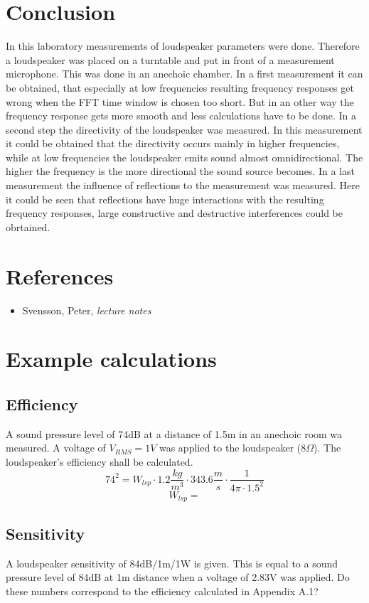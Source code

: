 \documentclass{article}
\begin{document}
\section{Conclusion}
In this laboratory measurements of loudspeaker parameters were done. Therefore a loudspeaker was placed on a turntable and put in front of a measurement microphone. This was done in an anechoic chamber. In a first measurement it can be obtained, that especially at low frequencies resulting frequency responses get wrong when the FFT time window is chosen too short. But in an other way the frequency response gets more smooth and less calculations have to be done. In a second step the directivity of the loudspeaker was measured. In this measurement it could be obtained that the directivity occurs mainly in higher frequencies, while at low frequencies the loudspeaker emits sound almost omnidirectional. The higher the frequency is the more directional the sound source becomes. In a last measurement the influence of reflections to the measurement was measured. Here it could be seen that reflections have huge interactions with the resulting frequency responses, large constructive and destructive interferences could be obrtained.

\newpage
\section*{References}
\footnotesize{
\begin{itemize}
\item Svensson, Peter, \textit{lecture notes}
\end{itemize}
}

\newpage
\appendix
\section{Example calculations}
\subsection{Efficiency}
A sound pressure level of 74dB at a distance of 1.5m in an anechoic room wa measured. A voltage of $V_{RMS}=1V$ was applied to the loudspeaker ($8\Omega$). The loudspeaker's efficiency shall be calculated.
$$74^2=W_{lsp}\cdot 1.2\frac{kg}{m^3}\cdot 343.6\frac{m}{s}\cdot\frac{1}{4\pi\cdot 1.5^2}$$
$$W_{lsp}=$$
\subsection{Sensitivity}
A loudspeaker sensitivity of 84dB/1m/1W is given. This is equal to a sound pressure level of 84dB at 1m distance when a voltage of 2.83V was applied. Do these numbers correspond to the efficiency calculated in Appendix A.1?
\end{document}
